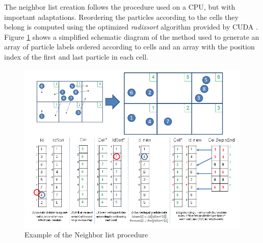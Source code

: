 The neighbor list creation follows the procedure used on a \ac{CPU}, but with important adaptations. Reordering the particles according to the cells they belong is computed using the optimized \textit{radixsort} algorithm provided by \ac{CUDA} \citep{Dominguez-2011}. Figure \ref{fig:neighbour-list} shows a simplified schematic diagram of the method used to generate an array of particle labels ordered according to cells and an array with the position index of the first and last particle in each cell. 
%
\begin{figure}[ht!]
	\centering
	\includegraphics[scale=0.75]{Figures/4.Chapter/GPU_1_alt.png}
	\caption{\small{Example of the Neighbor list procedure \citep{Crespo-2011}}}
	\label{fig:neighbour-list} 
\end{figure}
%

